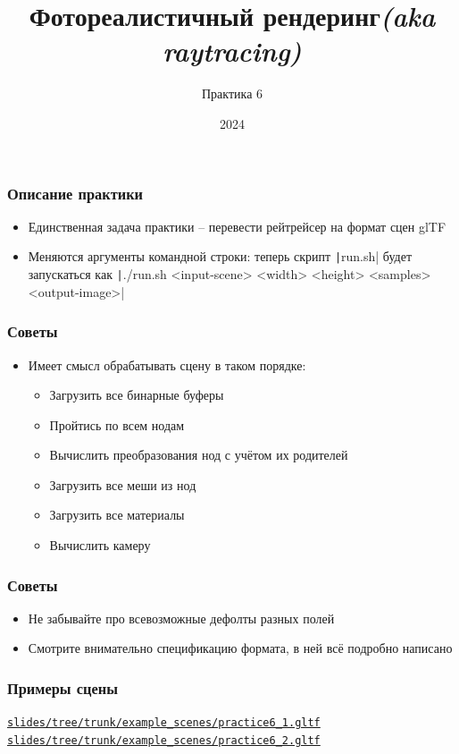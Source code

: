 \documentclass[10pt,handout]{beamer}
\title{Фотореалистичный рендеринг\quad\quad\quad\quad\quad\quad \textit{(aka raytracing)}}
\subtitle{Практика 6}
\date{2024}
\begin{document}
\frame{\titlepage}

\begin{frame}[fragile]
\frametitle{Описание практики}
\begin{itemize}
\item Единственная задача практики -- перевести рейтрейсер на формат сцен glTF
\item Меняются аргументы командной строки: теперь скрипт \texttt|run.sh| будет запускаться как
\texttt|./run.sh <input-scene> <width> <height> <samples> <output-image>|
\end{itemize}
\end{frame}

\begin{frame}[fragile]
\frametitle{Советы}
\begin{itemize}
\item Имеет смысл обрабатывать сцену в таком порядке:
\begin{itemize}
\item Загрузить все бинарные буферы
\item Пройтись по всем нодам
\item Вычислить преобразования нод с учётом их родителей
\item Загрузить все меши из нод
\item Загрузить все материалы
\item Вычислить камеру
\end{itemize}
\end{itemize}
\end{frame}

\begin{frame}[fragile]
\frametitle{Советы}
\begin{itemize}
\item Не забывайте про всевозможные дефолты разных полей
\item Смотрите внимательно спецификацию формата, в ней всё подробно написано
\end{itemize}
\end{frame}

\begin{frame}[fragile]
\frametitle{Примеры сцены}
\href{https://github.com/lisyarus/raytracing-course-slides/tree/trunk/example_scenes/practice6_1.gltf}{\texttt{slides/tree/trunk/example\_scenes/practice6\_1.gltf}}
\href{https://github.com/lisyarus/raytracing-course-slides/tree/trunk/example_scenes/practice6_2.gltf}{\texttt{slides/tree/trunk/example\_scenes/practice6\_2.gltf}}
\end{frame}
\end{document}
